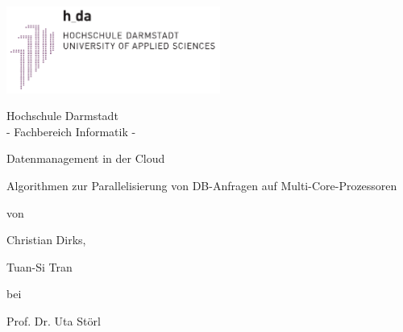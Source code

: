 \thispagestyle{plain}
\begin{titlepage}

\center

\includegraphics[width=7cm]{Bilder/h_da_logo}

\vspace{4em}

\Large{
		Hochschule Darmstadt\\
		- Fachbereich Informatik -
}

\vspace{4em}

\large{Datenmanagement in der Cloud}

\vspace{0.5em}

\huge{Algorithmen zur Parallelisierung von DB-Anfragen auf Multi-Core-Prozessoren}

\vspace{2em}

\large
{

\vfill
{
von

Christian Dirks,

Tuan-Si Tran
}

\vfill
{
bei

Prof. Dr. Uta Störl
}
}

\end{titlepage}